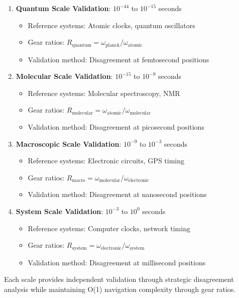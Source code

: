 \documentclass[12pt,a4paper]{article}
\begin{document}
\begin{enumerate}
\item \textbf{Quantum Scale Validation}: $10^{-44}$ to $10^{-15}$ seconds
   \begin{itemize}
   \item Reference systems: Atomic clocks, quantum oscillators
   \item Gear ratios: $R_{\text{quantum}} = \omega_{\text{planck}} / \omega_{\text{atomic}}$
   \item Validation method: Disagreement at femtosecond positions
   \end{itemize}

\item \textbf{Molecular Scale Validation}: $10^{-15}$ to $10^{-9}$ seconds
   \begin{itemize}
   \item Reference systems: Molecular spectroscopy, NMR
   \item Gear ratios: $R_{\text{molecular}} = \omega_{\text{atomic}} / \omega_{\text{molecular}}$
   \item Validation method: Disagreement at picosecond positions
   \end{itemize}

\item \textbf{Macroscopic Scale Validation}: $10^{-9}$ to $10^{-3}$ seconds
   \begin{itemize}
   \item Reference systems: Electronic circuits, GPS timing
   \item Gear ratios: $R_{\text{macro}} = \omega_{\text{molecular}} / \omega_{\text{electronic}}$
   \item Validation method: Disagreement at nanosecond positions
   \end{itemize}

\item \textbf{System Scale Validation}: $10^{-3}$ to $10^0$ seconds
   \begin{itemize}
   \item Reference systems: Computer clocks, network timing
   \item Gear ratios: $R_{\text{system}} = \omega_{\text{electronic}} / \omega_{\text{system}}$
   \item Validation method: Disagreement at millisecond positions
   \end{itemize}
\end{enumerate}

Each scale provides independent validation through strategic disagreement analysis while maintaining O(1) navigation complexity through gear ratios.
\end{document}
